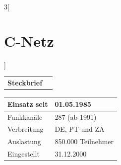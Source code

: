 \begin{multicols}{3}[\section{C-Netz}]


\newrefsegment

\begin{boxedminipage}{\linewidth}
\begin{tabular}{p{}p{2.7 cm}}
\textbf{Steckbrief}& \\
\end{tabular}
\begin{tabular}{p{}|p{2.7 cm}}
      Einsatz seit & 01.05.1985\\
      \hline
      Funkkanäle & 287 (ab 1991)\\
      \hline
      Verbreitung & DE, PT und ZA\\
      \hline
      Auslastung & 850.000 Teilnehmer\\
      \hline
      Eingestellt & 31.12.2000\\
\end{tabular}
\end{boxedminipage}
\par


\end{multicols}
